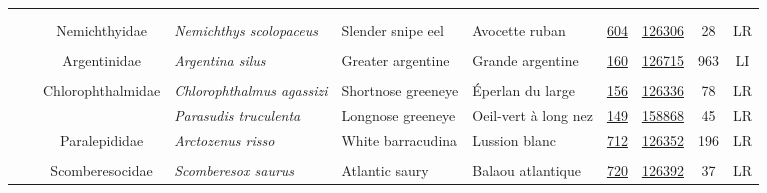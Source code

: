 \documentclass[12pt]{article}\usepackage[]{graphicx}\usepackage[]{color}
\begin{document}
\begin{landscapepage}
\begin{longtable}[t]{ccc>{\centering\arraybackslash}p{3cm}>{\centering\arraybackslash}p{3cm}>{\centering\arraybackslash}p{3cm}>{}c>{}ccc}
\endfoot
\bottomrule
\endlastfoot
\addlinespace[0.3em]
\\
\addlinespace[0.3em]
\\
\hspace{1em}\hspace{1em} &  & Nemichthyidae & \em{Nemichthys scolopaceus} & Slender snipe eel & Avocette ruban & \href{#sec:604}{604} & \href{http://www.marinespecies.org/aphia.php?p=taxdetails&id=126306}{126306} & 28 & LR\\
\addlinespace[0.3em]
\\
\hspace{1em}\hspace{1em} &  & Argentinidae & \em{Argentina silus} & Greater argentine & Grande argentine & \href{#sec:160}{160} & \href{http://www.marinespecies.org/aphia.php?p=taxdetails&id=126715}{126715} & 963 & LI\\
\addlinespace[0.3em]
\\
\hspace{1em}\hspace{1em} &  & Chlorophthalmidae & \em{Chlorophthalmus agassizi} & Shortnose greeneye & Éperlan du large & \href{#sec:156}{156} & \href{http://www.marinespecies.org/aphia.php?p=taxdetails&id=126336}{126336} & 78 & LR\\
\hspace{1em}\hspace{1em} &  &  & \em{Parasudis truculenta} & Longnose greeneye & Oeil-vert à long nez & \href{#sec:149}{149} & \href{http://www.marinespecies.org/aphia.php?p=taxdetails&id=158868}{158868} & 45 & LR\\
\hspace{1em}\hspace{1em} &  & Paralepididae & \em{Arctozenus risso} & White barracudina & Lussion blanc & \href{#sec:712}{712} & \href{http://www.marinespecies.org/aphia.php?p=taxdetails&id=126352}{126352} & 196 & LR\\
\addlinespace[0.3em]
\\
\hspace{1em}\hspace{1em} &  & Scomberesocidae & \em{Scomberesox saurus} & Atlantic saury & Balaou atlantique & \href{#sec:720}{720} & \href{http://www.marinespecies.org/aphia.php?p=taxdetails&id=126392}{126392} & 37 & LR\\

\end{longtable}
\end{landscapepage}
\end{document}
